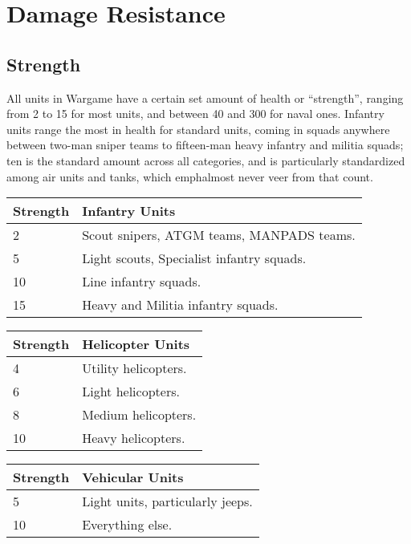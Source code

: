 \documentclass{article}
\begin{document}
\section{Damage Resistance}

\subsection{Strength}

All units in Wargame have a certain set amount of health or ``strength'', ranging
from 2 to 15 for most units, and between 40 and 300 for naval ones. Infantry
units range the most in health for standard units, coming in squads anywhere
between two-man sniper teams to fifteen-man heavy infantry and militia squads;
ten is the standard amount across all categories, and is particularly
standardized among air units and tanks, which emph{almost} never veer from that
count.

\begin{center}
    \begin{tabular}{ | l | p{7.5cm} | }
    \hline
    Strength & Infantry Units \\ \hline
    2 & Scout snipers, ATGM teams, MANPADS teams.  \\ 
    5 & Light scouts, Specialist infantry squads. \\ 
    10 & Line infantry squads. \\
    15 & Heavy and Militia infantry squads. \\ \hline
    \end{tabular}
\end{center}

\begin{center}
    \begin{tabular}{ | l | p{7.5cm} | }
    \hline
    Strength & Helicopter Units \\ \hline
    4 & Utility helicopters. \\
    6 & Light helicopters. \\ 
    8 & Medium helicopters. \\ 
    10 & Heavy helicopters. \\ \hline
    \end{tabular}
\end{center}

\begin{center}
    \begin{tabular}{ | l | p{7.5cm} | }
    \hline
    Strength & Vehicular Units \\ \hline
    5 & Light units, particularly jeeps. \\
    10 & Everything else. \\ \hline
    \end{tabular}
\end{center}
\end{document}
